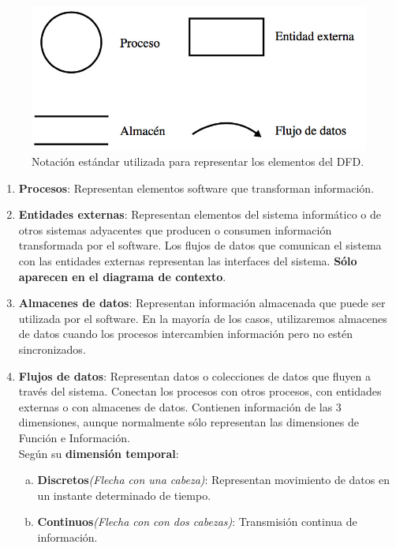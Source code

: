 \begin{figure}[H]
  \centering
  \includegraphics[width=0.5\linewidth]{Resources/elementosDFD}
  \caption{Notación estándar utilizada para representar los elementos del DFD.}
  \label{fig:elementosDFD}
\end{figure}
\begin{enumerate}
    \item \textbf{Procesos}: Representan elementos software que transforman información.
    
    \item \textbf{Entidades externas}: Representan elementos del sistema informático o de otros sistemas adyacentes que producen o consumen información transformada por el software. Los flujos de datos que comunican el sistema con las entidades externas representan las interfaces del sistema. \textbf{Sólo aparecen en el diagrama de contexto}.
    
   \item \textbf{Almacenes de datos}: Representan información almacenada que puede ser utilizada por el software. En la mayoría de los casos, utilizaremos almacenes de datos cuando los procesos intercambien información pero no estén sincronizados.
   
   \item \textbf{Flujos de datos}: Representan datos o colecciones de datos que fluyen a través del sistema. Conectan los procesos con otros procesos, con entidades externas o con almacenes de datos. Contienen información de las 3 dimensiones, aunque normalmente sólo representan las dimensiones de Función e Información.\\
   Según su \textbf{dimensión temporal}:
      \begin{enumerate}[a.]
            \item \textbf{Discretos}\textit{(Flecha con una cabeza)}: Representan movimiento de datos en un instante determinado de tiempo.
            \item \textbf{Continuos}\textit{(Flecha con con dos cabezas)}: Transmisión continua de información. 
      \end{enumerate}
\end{enumerate}


